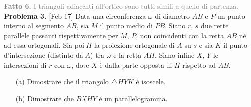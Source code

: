 \documentclass[a4paper]{article}
\theoremstyle{remark}
\theoremstyle{definition}
\begin{document}
\begin{multicols}{2}

\textcolor{gray}{\textbf{Fatto 6.} I triangoli adiacenti all'ortico sono tutti simili a quello di partenza.} \\

\textbf{Problema 3.} [Feb 17] Data una circonferenza $ \omega $ di diametro $ AB $ e $ P $ un punto interno al segmento $ AB $, sia $ M $ il punto medio di $ PB $. Siano $ r $, $ s $ due rette parallele passanti rispettivamente per $ M $, $ P $, non coincidenti con la retta $ AB $ nè ad essa ortogonali. Sia poi $ H $ la proiezione ortogonale di $ A $ su $ s $ e sia $ K $ il punto d’intersezione (distinto da $ A $) tra $ \omega $ e la retta $ AH $. Siano infine $ X $, $ Y $ le intersezioni di $ r $ con $ \omega $, dove $ X $ è dalla parte opposta di $ H $ rispetto ad $ AB $.
\begin{itemize}
	\item [(a)] Dimostrare che il triangolo $ \bigtriangleup HYK $ è isoscele.
	\item [(b)] Dimostrare che $ BXHY $ è un parallelogramma.
\end{itemize}
 

\end{multicols}
\end{document}
